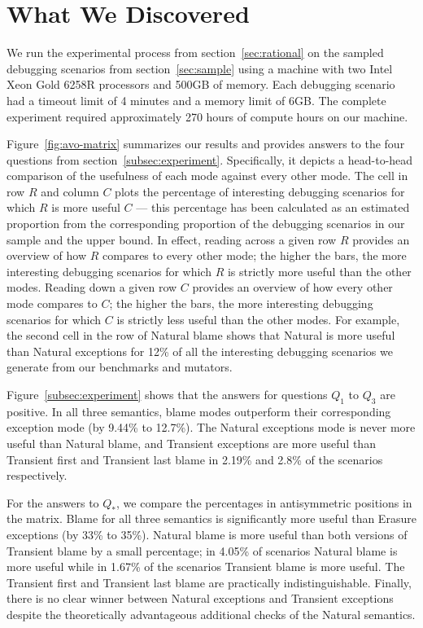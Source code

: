 \section{What We Discovered}



We run the experimental process from section~\ref{sec:rational} on the
sampled debugging scenarios from section~\ref{sec:sample} using a machine with two Intel Xeon Gold 6258R processors and 500GB of memory.
Each debugging scenario had a timeout limit of 4 minutes and a
memory limit of 6GB. The complete experiment required
approximately 270 hours of compute hours on our machine. 


Figure~\ref{fig:avo-matrix} summarizes our results and provides answers to
the four questions from section~\ref{subsec:experiment}.  Specifically, it
depicts a head-to-head comparison of the usefulness of each mode against
every other mode.  The cell in row $R$ and column $C$ plots the percentage
of interesting debugging scenarios for which $R$ is more useful $C$ ---
this percentage has been calculated as an estimated proportion from the
corresponding proportion of the debugging scenarios in our sample and the
upper bound.  In effect, reading across a given row $R$ provides an
overview of how $R$ compares to every other mode; the higher the bars, the
more interesting debugging scenarios for which $R$ is strictly more useful
than the other modes.  Reading down a given row $C$ provides an overview
of how every other mode compares to $C$; the higher the bars, the more
interesting debugging scenarios for which $C$ is strictly less useful than
the other modes. For example, the second cell in the row of Natural blame
shows that Natural is more useful than Natural exceptions for 12\% of all
the interesting debugging scenarios we generate from our benchmarks and
mutators. 

Figure~\ref{subsec:experiment} shows that the answers for questions $Q_1$
to $Q_3$ are positive. In all three semantics, blame modes outperform
their corresponding exception mode (by 9.44\% to 12.7\%). The Natural
exceptions mode is never more useful than Natural blame, and  Transient
exceptions are more useful than Transient first and Transient last blame
in 2.19\% and 2.8\% of the scenarios respectively. 


For the answers to $Q_*$, we compare the percentages in antisymmetric
positions in the matrix. Blame for all three semantics is significantly
more useful than Erasure exceptions (by 33\% to 35\%). Natural blame is
more useful than both versions of Transient blame by a small percentage;
in 4.05\% of scenarios Natural blame is more useful while in 1.67\% of the
scenarios Transient blame is more useful. The Transient first and
Transient last blame are practically indistinguishable. Finally, there is
no clear winner between Natural exceptions and Transient exceptions
despite the theoretically advantageous additional checks of the Natural
semantics.

